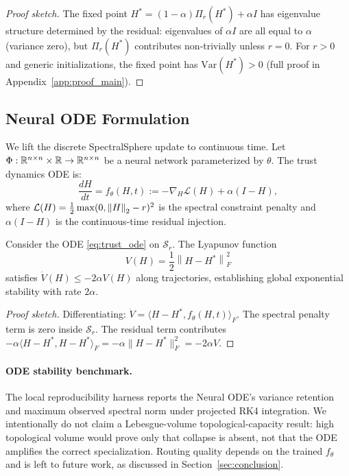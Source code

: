 \begin{proof}[Proof sketch]
  The fixed point $H^* = (1-\alpha)\Pi_r(H^*) + \alpha I$ has eigenvalue structure
  determined by the residual: eigenvalues of $\alpha I$ are all equal to $\alpha$
  (variance zero), but $\Pi_r(H^*)$ contributes non-trivially unless $r = 0$.  For
  $r > 0$ and generic initializations, the fixed point has $\mathrm{Var}(H^*) > 0$
  (full proof in Appendix~\ref{app:proof_main}).
\end{proof}

\subsection{Neural ODE Formulation}

We lift the discrete SpectralSphere update to continuous time.  Let $\Phi : \mathbb{R}^{n \times
n} \times \mathbb{R} \to \mathbb{R}^{n \times n}$ be a neural network parameterized by $\theta$.  The
trust dynamics ODE is:
\begin{equation}
  \label{eq:trust_ode}
  \frac{dH}{dt} = f_\theta(H, t) := -\nabla_H \mathcal{L}(H) + \alpha (I - H),
\end{equation}
where $\mathcal{L}(H) = \frac{1}{2}\max(0, \left\|H\right\|_2 - r)^2$ is the spectral
constraint penalty and $\alpha(I - H)$ is the continuous-time residual injection.

\begin{theorem}
  \label{thm:ode_stability}
  Consider the ODE \eqref{eq:trust_ode} on $\mathcal{S}_r$.  The Lyapunov function
  \[
    V(H) = \frac{1}{2}\left\|H - H^*\right\|_F^2
  \]
  satisfies $\dot{V}(H) \leq -2\alpha V(H)$ along trajectories, establishing global
  exponential stability with rate $2\alpha$.
\end{theorem}

\begin{proof}[Proof sketch]
  Differentiating: $\dot{V} = \langle H - H^*, f_\theta(H, t) \rangle_F$.  The spectral
  penalty term is zero inside $\mathcal{S}_r$.  The residual term contributes
  $-\alpha \langle H - H^*, H - H^* \rangle_F = -\alpha \|H - H^*\|_F^2 = -2\alpha V$.
\end{proof}

\paragraph{ODE stability benchmark.}
The local reproducibility harness reports the Neural ODE's variance retention and
maximum observed spectral norm under projected RK4 integration.  We intentionally do not
claim a Lebesgue-volume topological-capacity result: high topological volume would prove
only that collapse is absent, not that the ODE amplifies the correct specialization.
Routing quality depends on the trained $f_\theta$ and is left to future work, as
discussed in Section~\ref{sec:conclusion}.

